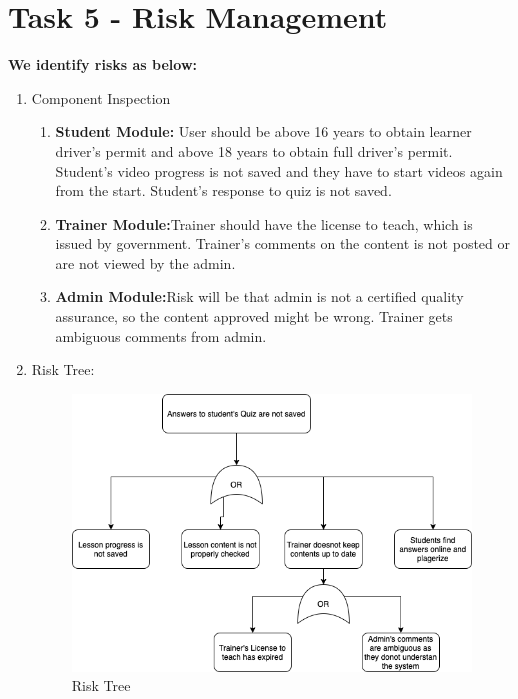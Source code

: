 \documentclass{article}
\begin{document}
\section{Task 5 - Risk Management}
\textbf{We identify risks as below:}\\
\begin{enumerate}
    \item Component Inspection
    \begin{enumerate}
        \item \textbf{Student Module:} User should be above 16 years to obtain learner driver's permit and above 18 years to obtain full driver's permit. Student's video progress is not saved and they have to start videos again from the start. Student's response to quiz is not saved.
        \item \textbf{Trainer Module:}Trainer should have the license to teach, which is issued by government. Trainer's comments on the content is not posted or are not viewed by the admin.
        \item \textbf{Admin Module:}Risk will be that admin is not a certified quality assurance, so the content approved might be wrong. Trainer gets ambiguous comments from admin.
    \end{enumerate}
    \item Risk Tree:
    \begin{figure}[htb!]
    \centering
    \includegraphics[scale=0.4]{D2.png}
    \caption{Risk Tree}
    \label{fig:my_label}
    \end{figure}\\[0.3cm]
    

\end{enumerate}
\end{document}
